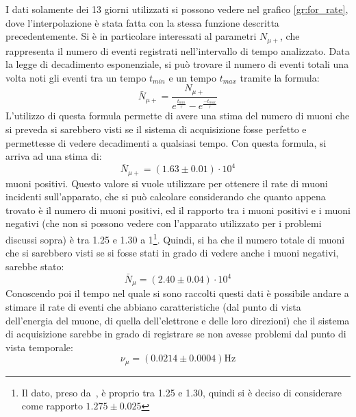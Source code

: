 I dati solamente dei 13 giorni utilizzati si possono vedere nel grafico \ref{gr:for_rate}, dove l'interpolazione è stata fatta con la stessa funzione descritta precedentemente. Si è in particolare interessati al parametri $N_{\mu+}$, che rappresenta il numero di eventi registrati nell'intervallo di tempo analizzato. Data la legge di decadimento esponenziale, si può trovare il numero di eventi totali una volta noti gli eventi tra un tempo $t_\textit{min}$ e un tempo $t_\textit{max}$  tramite la formula:
\begin{equation}
  \bar{N}_{\mu+} = \frac{N_{\mu+}}{e^{\frac{t_\textit{min}}{\tau}}-e^{\frac{-t_\textit{max}}{\tau}}}
  \label{eq:tot_mup}
\end{equation}
L'utilizzo di questa formula permette di avere una stima del numero di muoni che si preveda si sarebbero visti se il sistema di acquisizione fosse perfetto e permettesse di vedere decadimenti a qualsiasi tempo. Con questa formula, si arriva ad una stima di:
\begin{equation}
  \bar{N}_{\mu+} = (1.63 \pm 0.01) \cdot 10^4
\end{equation}
muoni positivi. Questo valore si vuole utilizzare per ottenere il rate di muoni incidenti sull'apparato, che si può calcolare considerando che quanto appena trovato è il numero di muoni positivi, ed il rapporto tra i muoni positivi e i muoni negativi (che non si possono vedere con l'apparato utilizzato per i problemi discussi sopra) è tra 1.25 e 1.30 a 1\footnote{Il dato, preso da~\cite{bib:Patrignani:2016xqp}, è proprio tra  1.25 e 1.30, quindi si è deciso di considerare come rapporto $1.275\pm0.025$}. Quindi, si ha che il numero totale di muoni che si sarebbero visti se si fosse stati in grado di vedere anche i muoni negativi, sarebbe stato:
\begin{equation}
  \bar{N}_{\mu} = (2.40 \pm 0.04) \cdot 10^4
\end{equation}
Conoscendo poi il tempo nel quale si sono raccolti questi dati è possibile andare a stimare il rate di eventi che abbiano caratteristiche (dal punto di vista dell'energia del muone, di quella dell'elettrone e delle loro direzioni) che il sistema di acquisizione sarebbe in grado di registrare se non avesse problemi dal punto di vista temporale:
\begin{equation}
  \nu_\mu = (0.0214 \pm 0.0004) \text{Hz}
\end{equation}
